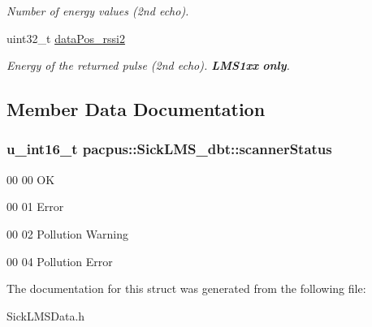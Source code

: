 \begin{DoxyCompactItemize}
\begin{DoxyCompactList}\small\item\em Number of energy values (2nd echo). \end{DoxyCompactList}\item 
\hypertarget{structpacpus_1_1SickLMS__dbt_a4a1509ac1b9821bb55d42c9fd1e25d12}{uint32\-\_\-t \hyperlink{structpacpus_1_1SickLMS__dbt_a4a1509ac1b9821bb55d42c9fd1e25d12}{data\-Pos\-\_\-rssi2}}\label{structpacpus_1_1SickLMS__dbt_a4a1509ac1b9821bb55d42c9fd1e25d12}

\begin{DoxyCompactList}\small\item\em Energy of the returned pulse (2nd echo). {\bfseries L\-M\-S1xx} {\bfseries only}. \end{DoxyCompactList}\end{DoxyCompactItemize}


\subsection{Member Data Documentation}
\hypertarget{structpacpus_1_1SickLMS__dbt_a10e25b3d9019c08a41ea8f52fc323345}{
\subsubsection[{scanner\-Status}]{\setlength{\rightskip}{0pt plus 5cm}u\-\_\-int16\-\_\-t pacpus\-::\-Sick\-L\-M\-S\-\_\-dbt\-::scanner\-Status}}\label{structpacpus_1_1SickLMS__dbt_a10e25b3d9019c08a41ea8f52fc323345}

\begin{DoxyItemize}
\item 00 00 O\-K
\item 00 01 Error
\item 00 02 Pollution Warning
\item 00 04 Pollution Error 
\end{DoxyItemize}

The documentation for this struct was generated from the following file\-:\begin{DoxyCompactItemize}
\item 
Sick\-L\-M\-S\-Data.\-h\end{DoxyCompactItemize}

